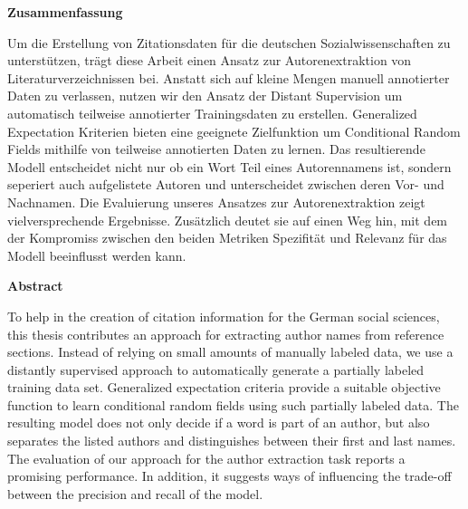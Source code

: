 \begin{center}
  \begin{large}
  \bfseries{Zusammenfassung}
  \end{large}
\end{center}
Um die Erstellung von Zitationsdaten f\"{u}r die deutschen Sozialwissenschaften zu unterst\"{u}tzen, trägt diese Arbeit einen Ansatz zur Autorenextraktion von Literaturverzeichnissen bei.
Anstatt sich auf kleine Mengen manuell annotierter Daten zu verlassen, nutzen wir den Ansatz der Distant Supervision um automatisch teilweise annotierter Trainingsdaten zu erstellen.
Generalized Expectation Kriterien bieten eine geeignete Zielfunktion um Conditional Random Fields mithilfe von teilweise annotierten Daten zu lernen.
Das resultierende Modell entscheidet nicht nur ob ein Wort Teil eines Autorennamens ist, sondern seperiert auch aufgelistete Autoren und unterscheidet zwischen deren Vor- und Nachnamen.
Die Evaluierung unseres Ansatzes zur Autorenextraktion zeigt vielversprechende Ergebnisse.
Zus\"{a}tzlich deutet sie auf einen Weg hin, mit dem der Kompromiss zwischen den beiden Metriken Spezifität und Relevanz f\"{u}r das Modell beeinflusst werden kann.
\par\bigskip
\par\bigskip
{}
\begin{center}
  \begin{large}
  \bfseries{Abstract}
  \end{large}
\end{center}
To help in the creation of citation information for the German social sciences, this thesis contributes an approach for extracting author names from reference sections.
Instead of relying on small amounts of manually labeled data, we use a distantly supervised approach to automatically generate a partially labeled training data set.
Generalized expectation criteria provide a suitable objective function to learn conditional random fields using such partially labeled data.
The resulting model does not only decide if a word is part of an author, but also separates the listed authors and distinguishes between their first and last names.
The evaluation of our approach for the author extraction task reports a promising performance.
In addition, it suggests ways of influencing the trade-off between the precision and recall of the model.
